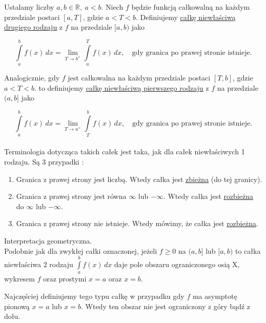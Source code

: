 \documentclass[12pt]{article}
\begin{document}
Ustalamy liczby $ a,b \in \mathbb{R}, \ a < b $. Niech $f$ będzie funkcją całkowalną na każdym przedziale postaci $[a, T] $,
gdzie $ a < T < b $. Definiujemy \underline{całkę niewłaściwą drugiego rodzaju} z $f$ na przedziale $[a, b)$ jako

$$ \int\limits_{a}^{b} f(x) \,dx = \lim_{T \to b^+} \int\limits_{a}^{T} f(x) \,dx, \quad \textrm{gdy granica po prawej stronie istnieje.}$$

Analogicznie, gdy $f$ jest całkowalna na każdym przedziale postaci $[T,b]$, gdzie $ a < T < b $. to definiujemy
\underline{całkę niewłaściwą pierwszego rodzaju} z $f$ na przedziale $(a, b]$ jako

$$ \int\limits_{a}^{b} f(x) \,dx = \lim_{T \to a^+} \int\limits_{T}^{b} f(x) \,dx, \quad \textrm{gdy granica po prawej stronie istnieje.}$$\\

Terminologia dotycząca takich całek jest taka, jak dla całek niewłaściwych 1 rodzaju. Są 3 przypadki : 

\begin{enumerate}
    \item Granica z prawej strony jest liczbą. Wtedy całka jest \underline{zbieżna} (do tej granicy).
    \item Granica z prawej strony jest równa $\infty$ lub $-\infty$. Wtedy całka jest \underline{rozbieżna} do $\infty$ lub $-\infty$.
    \item Granica z prawej strony nie istnieje. Wtedy mówimy, że całka jest \underline{rozbieżna}. \\
\end{enumerate}

Interpretacja geometryczna. \\

Podobnie jak dla zwykłej całki oznaczonej, jeżeli $f \geq 0$ na $(a,b]$ lub $[a,b)$ to całka niewłaściwa 2 rodzaju
$ \int\limits_{a}^{b} f(x) \,dx $ daje pole obszaru ograniczonego osią X, wykresem $f$ oraz prostymi $x=a$ oraz $x=b$.

Najczęściej definiujemy tego typu całkę w przypadku gdy $f$ ma asymptotę pionową $x=a$ lub $x=b$. Wtedy ten obszar
nie jest ograniczony z góry bądź z dołu.
\end{document}

